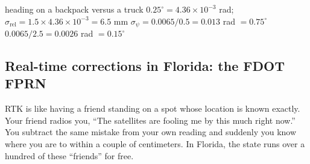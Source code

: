 \begin{worked}{heading on a backpack versus a truck}
 $0.25^\circ=4.36\times10^{-3}$ rad;\ $\sigma_{\text{rel}}=1.5\times4.36\times10^{-3}=6.5$ mm
 $\sigma_\psi=0.0065/0.5=0.013$ rad $=0.75^\circ$
 $0.0065/2.5=0.0026$ rad $=0.15^\circ$
\end{worked}

\subsection*{Real-time corrections in Florida: the FDOT FPRN}
\begin{kid}
RTK is like having a friend standing on a spot whose location is known exactly. Your friend radios you, ``The satellites are fooling me by this much right now.'' You subtract the same mistake from your own reading and suddenly you know where you are to within a couple of centimeters. In Florida, the state runs over a hundred of these ``friends'' for free.
\end{kid}

